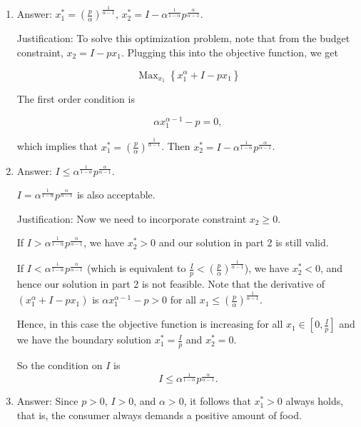 \documentclass{article}
\newenvironment{solution}{\color{red}}{\color{black}}
\DeclareMathOperator*{\Max}{Max}
\begin{document}
\begin{solution}
\begin{enumerate}
\item 
Answer: $x_1^* = \left( \frac{p}{\alpha} \right)^\frac1{\alpha-1}$, $x_2^* = I-\alpha^\frac1{1-\alpha} p^\frac\alpha{\alpha-1}$.

Justification: To solve this optimization problem, note that from the budget constraint, $x_2=I-p x_1$. Plugging this into the objective function, we get

\[ \Max_{x_1} \left\{ x_1^\alpha+I-px_1 \right\} \]

The first order condition is 

\[ \alpha x_1^{\alpha-1}-p=0, \]

which implies that $x_1^* = \left( \frac{p}{\alpha} \right)^{\frac{1}{\alpha-1}}$. Then $x_2^* = I-\alpha^{\frac{1}{1-\alpha}} p^{\frac{\alpha}{\alpha-1}}$.

\item 
Answer: $I \le \alpha^{\frac{1}{1-\alpha}} p^{\frac{\alpha}{\alpha-1}}$.

$I = \alpha^{\frac{1}{1-\alpha}}p^{\frac{\alpha}{\alpha-1}}$ is also acceptable.

Justification: Now we need to incorporate constraint $x_2 \geq 0$.

If $I > \alpha^{\frac{1}{1-\alpha}}p^{\frac{\alpha}{\alpha-1}}$, we have $x_2^* > 0$ and our solution in part 2 is still valid.

If $I < \alpha^{\frac{1}{1-\alpha}}p^{\frac{\alpha}{\alpha-1}}$ (which is equivalent to $\frac{I}{p} < \left( \frac{p}{\alpha} \right)^\frac{1}{\alpha-1}$), we have $x_2^* < 0$, and hence our solution in part 2 is not feasible. Note that the derivative of $(x_1^\alpha+I-px_1)$ is $\alpha x_1^{\alpha-1}-p>0$ for all $x_1 \le \left(\frac{p}{\alpha}\right)^{\frac{1}{\alpha-1}}$.

Hence, in this case the objective function is increasing for all $x_1 \in [0, \frac{I}{p}]$ and we have the boundary solution $x_1^*=\frac{I}{p}$ and $x_2^*=0$.

So the condition on $I$ is  
\[ I \le \alpha^{\frac{1}{1-\alpha}}p^{\frac{\alpha}{\alpha-1}}. \]

\item Answer: Since $p>0$, $I>0$, and $\alpha>0$, it follows that $x_1^*>0$ always holds, that is, the
consumer always demands a positive amount of food.
\end{enumerate}
\end{solution}
\end{document}
